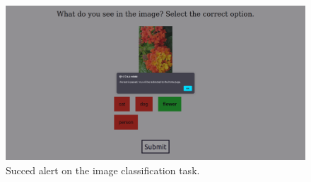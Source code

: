 \begin{figure}[h!t]
    \centering
    \includegraphics[scale=0.17]{assets/images/image_classification_succed.png}
    \caption{Succed alert on the image classification task.}
    \label{fig:gui:image_classification_succed}
\end{figure}
